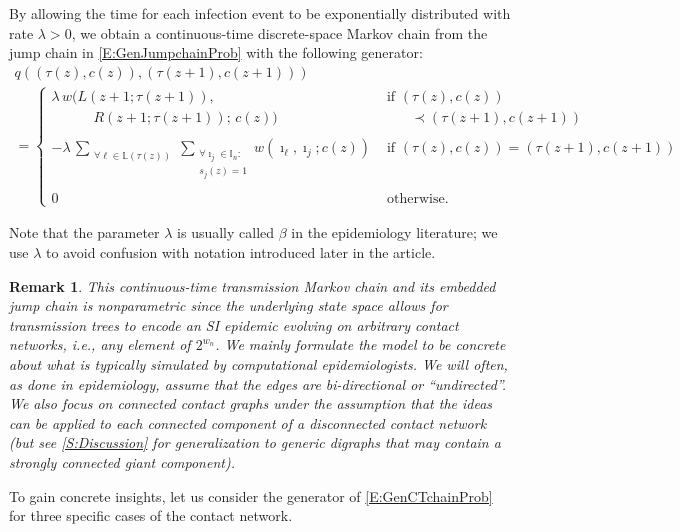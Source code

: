 \documentclass[review]{elsarticle}
\numberwithin{equation}{section}
\let\orgautoref\autoref
\renewcommand{\autoref}
        {\def\equationautorefname{Eq.}%
         \def\figureautorefname{Fig.}%
         \def\subfigureautorefname{Fig.}%
         \def\sectionautorefname{Sect.}%
         \def\subsectionautorefname{Sect.}%
         \def\subsubsectionautorefname{Sect.}%
         \def\Itemautorefname{item}%
         \def\tableautorefname{Table}%
         \def\propositionautorefname{Prop.}%
         \def\corollaryautorefname{Corollary}%
         \def\theoremautorefname{Theorem}%
         \def\remarkautorefname{Remark}%
         \def\lemmaautorefname{Lemma}%
         \def\proofofautorefname{Proof}%
         \def\exampleautorefname{Example}%
         \orgautoref}
\newcommand{\bI}{{\mathbb I}}
\newcommand{\bL}{{\mathbb L}}
\newtheorem{remark}{Remark}%
\begin{document}
By allowing the time for each infection event to be exponentially distributed with rate $\lambda>0$, we obtain a continuous-time discrete-space Markov chain from the jump chain in \autoref{E:GenJumpchainProb} with the following generator: 
\begin{multline}\label{E:GenCTchainProb}
q\left( (\tau(z),c(z)), (\tau(z+1),c(z+1)) \right)\\
=
\begin{cases}
\lambda \, w(L(z+1;\tau(z+1)),
& \text{ if } (\tau(z),c(z)) \\
\qquad \quad R(z+1;\tau(z+1));\, c(z)) 
& \qquad  \prec (\tau(z+1),c(z+1))\\\\
-\lambda \, {\sum_{\substack{\forall \ell \in \bL(\tau(z))}}
\sum_{\substack{\forall \imath_j \in \bI_n :\\ s_j(z)=1}}
w(\imath_{\ell},\imath_j ; c(z))} 
& \text{ if } (\tau(z),c(z)) %
= (\tau(z+1),c(z+1))\\\\
0 & \text{ otherwise}.
\end{cases}
\end{multline}

\noindent Note that the parameter $\lambda$ is usually called $\beta$ in the epidemiology literature; we use $\lambda$ to avoid confusion with notation introduced later in the article.

\begin{remark}
This continuous-time transmission Markov chain and its embedded jump chain is  nonparametric since the underlying state space allows for transmission trees to encode an SI epidemic evolving on arbitrary contact networks, i.e., any element of $2^{w_n}$.  
We mainly formulate the model to be concrete about what is typically simulated by computational epidemiologists. 
We will often, as done in epidemiology, assume that the edges are bi-directional or ``undirected''.  
We also focus on connected contact graphs under the assumption that the ideas can be applied to each connected component of a disconnected contact network (but see \autoref{S:Discussion} for generalization to generic digraphs that may contain a strongly connected giant component).
\end{remark}

To gain concrete insights, let us consider the generator of \autoref{E:GenCTchainProb} for three specific cases of the contact network. 
\end{document}
